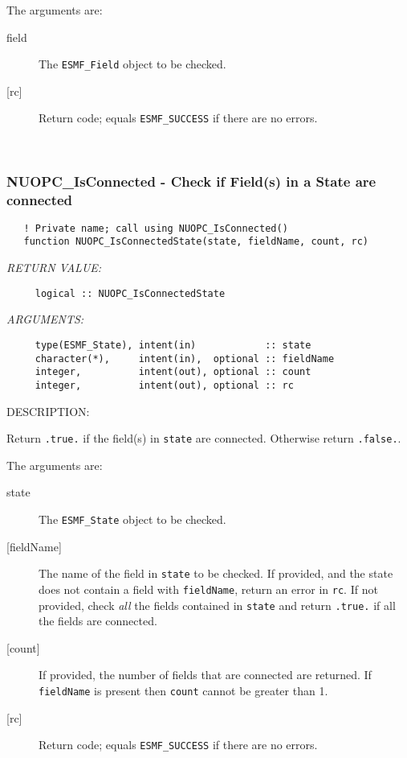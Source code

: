      The arguments are:
     \begin{description}
     \item[field]
       The {\tt ESMF\_Field} object to be checked.
     \item[{[rc]}]
       Return code; equals {\tt ESMF\_SUCCESS} if there are no errors.
     \end{description}
   
 
\mbox{}\hrulefill\ 
 
\subsubsection [NUOPC\_IsConnected] {NUOPC\_IsConnected - Check if Field(s) in a State are connected}


\begin{verbatim}   ! Private name; call using NUOPC_IsConnected()
   function NUOPC_IsConnectedState(state, fieldName, count, rc)\end{verbatim}{\em RETURN VALUE:}
\begin{verbatim}     logical :: NUOPC_IsConnectedState\end{verbatim}{\em ARGUMENTS:}
\begin{verbatim}     type(ESMF_State), intent(in)            :: state
     character(*),     intent(in),  optional :: fieldName
     integer,          intent(out), optional :: count
     integer,          intent(out), optional :: rc\end{verbatim}
{\sf DESCRIPTION:\\ }


     Return {\tt .true.} if the field(s) in {\tt state} are connected. Otherwise
     return {\tt .false.}.
  
     The arguments are:
     \begin{description}
     \item[state]
       The {\tt ESMF\_State} object to be checked.
     \item[{[fieldName]}]
       The name of the field in {\tt state} to be checked. If provided, and 
       the state does not contain a field with {\tt fieldName}, return an 
       error in {\tt rc}. If not provided, check {\em all} the fields contained
       in {\tt state} and return {\tt .true.} if all the fields are connected.
     \item[{[count]}]
       If provided, the number of fields that are connected are returned. If 
       {\tt fieldName} is present then {\tt count} cannot be greater than 1.
     \item[{[rc]}]
       Return code; equals {\tt ESMF\_SUCCESS} if there are no errors.
     \end{description}
   
